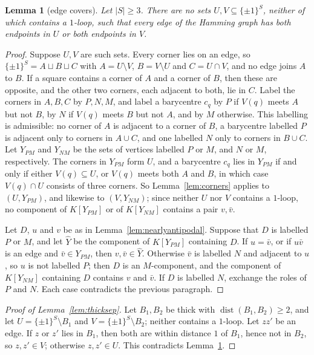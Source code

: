 \documentclass[11pt,letterpaper]{article}
\newtheorem{lemma}[theorem]{Lemma}
\theoremstyle{definition}
\newcommand{\cube}[1]{\{\pm1\}^{#1}}
\DeclareMathOperator{\dist}{dist}
\begin{document}
\begin{lemma}[edge covers]\label{lem:edgecover}
Let $|S|\ge3$. There are no sets $U,V\subseteq\cube S$, neither of which contains a $1$-loop, such
that every edge of the Hamming graph has both endpoints in $U$ or both endpoints in $V$.
\end{lemma}

\begin{proof}
Suppose $U,V$ are such sets. Every corner lies on an edge, so $\cube S=A\sqcup B\sqcup C$ with
$A=U\setminus V$, $B=V\setminus U$ and $C=U\cap V$, and no edge joins $A$ to $B$. If a square contains
a corner of $A$ and a corner of $B$, then these are opposite, and the other two corners, each adjacent
to both, lie in $C$. Label the corners in $A,B,C$ by $P,N,M$, and label a barycentre $c_q$ by $P$ if
$V(q)$ meets $A$ but not $B$, by $N$ if $V(q)$ meets $B$ but not $A$, and by $M$ otherwise. This
labelling is admissible: no corner of $A$ is adjacent to a corner of $B$, a barycentre labelled $P$
is adjacent only to corners in $A\cup C$, and one labelled $N$ only to corners in $B\cup C$. Let
$Y_{PM}$ and $Y_{NM}$ be the sets of vertices labelled $P$ or $M$, and $N$ or $M$, respectively. The
corners in $Y_{PM}$ form $U$, and a barycentre $c_q$ lies in $Y_{PM}$ if and only if either
$V(q)\subseteq U$, or $V(q)$ meets both $A$ and $B$, in which case $V(q)\cap U$ consists of three
corners. So Lemma~\ref{lem:corners} applies to $(U,Y_{PM})$, and likewise to $(V,Y_{NM})$; since
neither $U$ nor $V$ contains a $1$-loop, no component of $K[Y_{PM}]$ or of $K[Y_{NM}]$ contains a
pair $v,\bar v$.

Let $D$, $u$ and $v$ be as in Lemma~\ref{lem:nearlyantipodal}. Suppose that $D$ is labelled $P$ or
$M$, and let $\hat Y$ be the component of $K[Y_{PM}]$ containing $D$. If $u=\bar v$, or if $u\bar v$
is an edge and $\bar v\in Y_{PM}$, then $v,\bar v\in\hat Y$. Otherwise $\bar v$ is labelled $N$ and
adjacent to $u$, so $u$ is not labelled $P$; then $D$ is an $M$-component, and the component of
$K[Y_{NM}]$ containing $D$ contains $v$ and $\bar v$. If $D$ is labelled $N$, exchange the roles of
$P$ and $N$. Each case contradicts the previous paragraph.
\end{proof}

\begin{proof}[Proof of Lemma~\ref{lem:thicksep}]
Let $B_1,B_2$ be thick with $\dist(B_1,B_2)\ge2$, and let $U=\cube S\setminus B_1$ and
$V=\cube S\setminus B_2$; neither contains a $1$-loop. Let $zz'$ be an edge. If $z$ or $z'$ lies in
$B_1$, then both are within distance $1$ of $B_1$, hence not in $B_2$, so $z,z'\in V$; otherwise
$z,z'\in U$. This contradicts Lemma~\ref{lem:edgecover}.
\end{proof}
\end{document}

